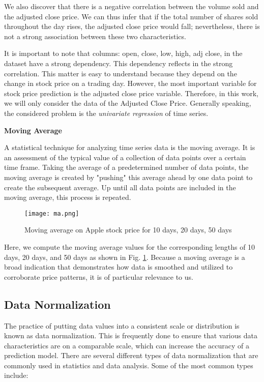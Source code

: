 \documentclass[a4paper]{article}
\begin{document}
We also discover that there is a negative correlation between the volume sold and the adjusted close price. We can thus infer that if the total number of shares sold throughout the day rises, the adjusted close price would fall; nevertheless, there is not a strong association between these two characteristics.

It is important to note that columns: open, close, low, high, adj close, in the dataset have a strong dependency. This dependency reflects in the strong correlation. This matter is easy to understand because they depend on the change in stock price on a trading day. However, the most important variable for stock price prediction is the adjusted close price variable. Therefore, in this work, we will only consider the data of the Adjusted Close Price. Generally speaking, the considered problem is the \textit{univariate regression} of time series.

\textbf{Moving Average}

A statistical technique for analyzing time series data is the moving average. It is an assessment of the typical value of a collection of data points over a certain time frame. Taking the average of a predetermined number of data points, the moving average is created by "pushing" this average ahead by one data point to create the subsequent average. Up until all data points are included in the moving average, this process is repeated.

\begin{figure}[!h]
    \centering
    \texttt{[image: ma.png]}
    \caption{Moving average on Apple stock price for 10 days, 20 days, 50 days}
    \label{fig:ma}
\end{figure}

Here, we compute the moving average values for the corresponding lengths of 10 days, 20 days, and 50 days as shown in Fig. \ref{fig:ma}. Because a moving average is a broad indication that demonstrates how data is smoothed and utilized to corroborate price patterns, it is of particular relevance to us.
\subsection{Data Normalization}
The practice of putting data values into a consistent scale or distribution is known as data normalization. This is frequently done to ensure that various data characteristics are on a comparable scale, which can increase the accuracy of a prediction model. There are several different types of data normalization that are commonly used in statistics and data analysis. Some of the most common types include:
\end{document}
